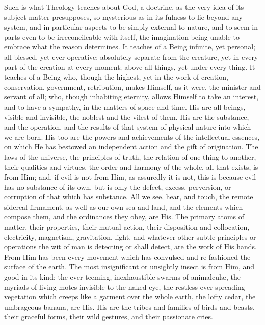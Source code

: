 Such is what Theology teaches about God, a doctrine, as the very
idea of its subject-matter presupposes, so mysterious as in its
fulness to lie beyond any system, and in particular aspects to be
simply external to nature, and to seem in parts even to be
irreconcileable with itself, the imagination being unable to embrace
what the reason determines. It teaches of a Being infinite, yet
personal; all-blessed, yet ever operative; absolutely separate from
the creature, yet in every part of the creation at every moment; above
all things, yet under every thing. It teaches of a Being who, though
the highest, yet in the work of creation, conservation, government,
retribution, makes Himself, as it were, the minister and servant of
all; who, though inhabiting eternity, allows Himself to take an
interest, and to have a sympathy, in the matters of space and time.
His are all beings, visible and invisible, the noblest and the vilest
of them. His are the substance, and the operation, and the results of
that system of physical nature into which we are born. His too are the
powers and achievements of the intellectual essences, on which He has
bestowed an independent action and the gift of origination. The laws
of the universe, the principles of truth, the relation of one thing to
another, their qualities and virtues, the order and harmony of the
whole, all that exists, is from Him; and, if evil is not from
Him, as assuredly it is not, this is because evil has no substance of
its own, but is only the defect, excess, perversion, or corruption of
that which has substance. All we see, hear, and touch, the remote
sidereal firmament, as well as our own sea and land, and the elements
which compose them, and the ordinances they obey, are His. The primary
atoms of matter, their properties, their mutual action, their
disposition and collocation, electricity, magnetism, gravitation,
light, and whatever other subtle principles or operations the wit of
man is detecting or shall detect, are the work of His hands. From Him
has been every movement which has convulsed and re-fashioned the
surface of the earth. The most insignificant or unsightly insect is
from Him, and good in its kind; the ever-teeming, inexhaustible swarms
of animalculæ, the myriads of living motes invisible to the naked
eye, the restless ever-spreading vegetation which creeps like a
garment over the whole earth, the lofty cedar, the umbrageous banana,
are His. His are the tribes and families of birds and beasts, their
graceful forms, their wild gestures, and their passionate cries.

